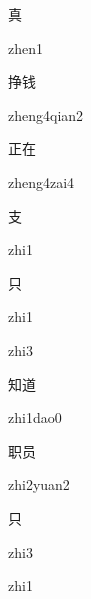 \begin{multicols*}{2}
\begin{verbete}[zhen1]{真}
\begin{pronuncia}{zhen1}
\end{pronuncia}
\end{verbete}

\begin{verbete}{挣钱}
\begin{pronuncia}{zheng4qian2}
\end{pronuncia}
\end{verbete}

\begin{verbete}{正在}
\begin{pronuncia}{zheng4zai4}
\end{pronuncia}
\end{verbete}

\begin{verbete}[zhi1]{支}
\begin{pronuncia}{zhi1}
\end{pronuncia}
\end{verbete}

\begin{verbete}[zhi1]{只}
\begin{pronuncia}{zhi1}
\end{pronuncia}
\begin{pronuncia}{zhi3}
\end{pronuncia}
\end{verbete}

\begin{verbete}{知道}
\begin{pronuncia}{zhi1dao0}
\end{pronuncia}
\end{verbete}

\begin{verbete}{职员}
\begin{pronuncia}{zhi2yuan2}
\end{pronuncia}
\end{verbete}

\begin{verbete}[zhi3]{只}
\begin{pronuncia}{zhi3}
\end{pronuncia}
\begin{pronuncia}{zhi1}
\end{pronuncia}
\end{verbete}


\end{multicols*}
